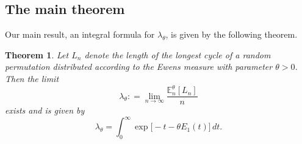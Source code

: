 \documentclass{amsart}
\newtheorem{theorem}{Theorem}[section]
\theoremstyle{definition}
\theoremstyle{remark}
\numberwithin{equation}{section}
\newcommand{\deq}{\mathrel{\mathop:}=}
\begin{document}
\subsection{The main theorem}
\label{subsec:main}

Our main result, an integral formula for $\lambda_{\theta}$, is given by the following theorem.

\begin{theorem} %
Let $L_{n}$ denote the length of the longest cycle of a random permutation distributed according to the Ewens measure with parameter $\theta>0$. Then the limit
\begin{equation}
\lambda_{\theta} 
\deq \lim_{n \to \infty} \frac{\mathbb{E}_{n}^{\theta}[L_{n}]}{n}
\end{equation}
exists and is given by
\begin{equation}
\lambda_{\theta}
= \int_{0}^{\infty} \exp\bigl[-t-\theta E_{1}(t)\bigr]\,dt.
\end{equation}
\end{theorem}
%
\end{document}
